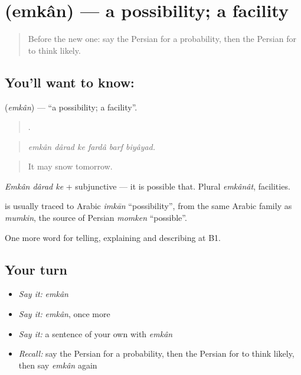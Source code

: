 \section[\texorpdfstring{\fa{امکان} (emkân)}{امکان (emkân)}]{ (emkân) — a possibility; a facility}

\label{lesson:FA-C392-emkan}



\begin{quote}
Before the new one: say the Persian for a probability, then the Persian for to think likely.
\end{quote}

\subsection*{You'll want to know: }
\textbf{} (\emph{emkân}) — \textquotedblleft{}a possibility; a facility\textquotedblright{}.

\begin{quote}
     .
\end{quote}

\begin{quote}
\emph{emkân dârad ke fardâ barf biyâyad.}
\end{quote}

\begin{quote}
It may snow tomorrow.
\end{quote}

\emph{Emkân dârad ke} + subjunctive — it is possible that. Plural \emph{emkânât}, facilities.

\begin{cousinweb}
\textbf{} is usually traced to Arabic \emph{imkān} \textquotedblleft{}possibility\textquotedblright{}, from the same Arabic family as \emph{mumkin}, the source of Persian \emph{momken} \textquotedblleft{}possible\textquotedblright{}.
\end{cousinweb}

\begin{grammarlens}[title={What you've built}]
One more word for telling, explaining and describing at B1.
\end{grammarlens}

\subsection*{Your turn}
\begin{itemize}
\raggedright
  \item \emph{Say it:} \emph{emkân}
  \item \emph{Say it:} \emph{emkân}, once more
  \item \emph{Say it:} a sentence of your own with \emph{emkân}
  \item \emph{Recall:} say the Persian for a probability, then the Persian for to think likely, then say \emph{emkân} again
\end{itemize}

